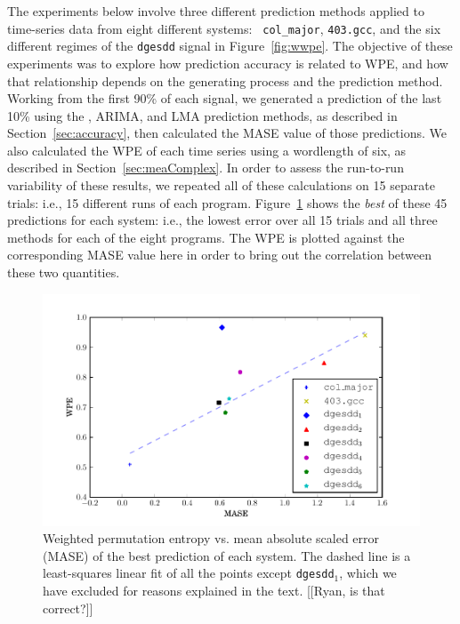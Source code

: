 The experiments below involve three different prediction methods
applied to time-series data from eight different systems: {\tt
  col\_major}, {\tt 403.gcc}, and the six different regimes of the
{\tt dgesdd} signal in Figure~\ref{fig:wwpe}.  The objective of these
experiments was to explore how prediction accuracy is related to WPE,
and how that relationship depends on the generating process and the
prediction method.  Working from the first 90\% of each signal, we
generated a prediction of the last 10\% using the \naive, ARIMA, and
LMA prediction methods, as described in Section~\ref{sec:accuracy},
then calculated the MASE value of those predictions.  We also
calculated the WPE of each time series using a wordlength of six, as
described in Section~\ref{sec:meaComplex}.  In order to assess the
run-to-run variability of these results, we repeated all of these
calculations on 15 separate trials: i.e., 15 different runs of each
program.  Figure~\ref{fig:wpe_vs_mase_best} shows the {\sl best} of
these 45 predictions for each system: i.e., the lowest error over all
15 trials and all three methods for each of the eight programs.  The
WPE is plotted against the corresponding MASE value here in order to
bring out the correlation between these two quantities.
\begin{figure}[htbp]
  \centering
  \includegraphics[width=\columnwidth]{figs/prediction_vs_entropy}
  \caption{Weighted permutation entropy vs. mean absolute scaled error
    (MASE) of the best prediction of each system.
% 
% 
The dashed line is a least-squares linear fit of all the points except
{\tt dgesdd$_1$}, which we have excluded for reasons explained in the
text.  [[Ryan, is that correct?]]}
  \label{fig:wpe_vs_mase_best}
\end{figure}

